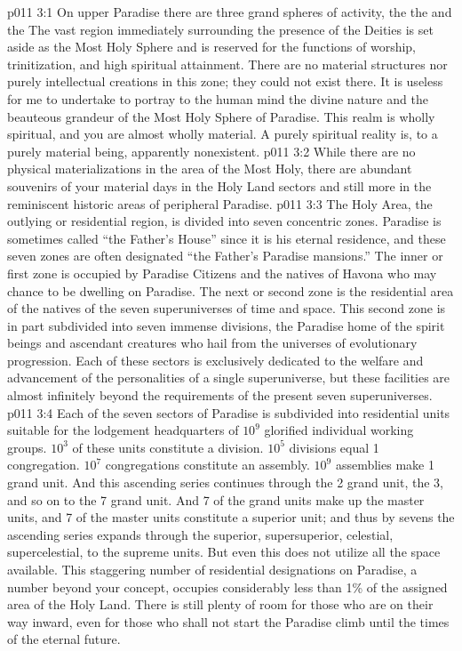 \vs p011 3:1 On upper Paradise there are three grand spheres of activity, the  the  and the  The vast region immediately surrounding the presence of the Deities is set aside as the Most Holy Sphere and is reserved for the functions of worship, trinitization, and high spiritual attainment. There are no material structures nor purely intellectual creations in this zone; they could not exist there. It is useless for me to undertake to portray to the human mind the divine nature and the beauteous grandeur of the Most Holy Sphere of Paradise. This realm is wholly spiritual, and you are almost wholly material. A purely spiritual reality is, to a purely material being, apparently nonexistent.
\vs p011 3:2 While there are no physical materializations in the area of the Most Holy, there are abundant souvenirs of your material days in the Holy Land sectors and still more in the reminiscent historic areas of peripheral Paradise.
\vs p011 3:3 The Holy Area, the outlying or residential region, is divided into seven concentric zones. Paradise is sometimes called “the Father’s House” since it is his eternal residence, and these seven zones are often designated “the Father’s Paradise mansions.” The inner or first zone is occupied by Paradise Citizens and the natives of Havona who may chance to be dwelling on Paradise. The next or second zone is the residential area of the natives of the seven superuniverses of time and space. This second zone is in part subdivided into seven immense divisions, the Paradise home of the spirit beings and ascendant creatures who hail from the universes of evolutionary progression. Each of these sectors is exclusively dedicated to the welfare and advancement of the personalities of a single superuniverse, but these facilities are almost infinitely beyond the requirements of the present seven superuniverses.
\vs p011 3:4 Each of the seven sectors of Paradise is subdivided into residential units suitable for the lodgement headquarters of $10^9$ glorified individual working groups. $10^3$ of these units constitute a division. $10^5$ divisions equal 1 congregation. $10^7$ congregations constitute an assembly. $10^9$ assemblies make 1 grand unit. And this ascending series continues through the 2 grand unit, the 3, and so on to the 7 grand unit. And 7 of the grand units make up the master units, and 7 of the master units constitute a superior unit; and thus by sevens the ascending series expands through the superior, supersuperior, celestial, supercelestial, to the supreme units. But even this does not utilize all the space available. This staggering number of residential designations on Paradise, a number beyond your concept, occupies considerably less than 1\% of the assigned area of the Holy Land. There is still plenty of room for those who are on their way inward, even for those who shall not start the Paradise climb until the times of the eternal future.
